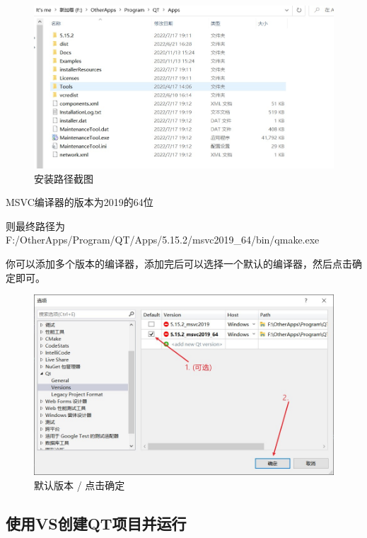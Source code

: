\documentclass[cs4size,a4paper]{ctexart}
\numberwithin{equation}{section}
\numberwithin{table}{section}
\numberwithin{figure}{section}
\begin{document}
\begin{figure}[H]
\small
\centering
\includegraphics[width=\textwidth]{安装路径截图.jpg}
\caption{安装路径截图} \label{fig:安装路径截图}
\end{figure}

MSVC编译器的版本为\colorbox{LetMeFlyGray}{2019}的\colorbox{LetMeFlyGray}{64位}

则最终路径为\colorbox{LetMeFlyGray}{F:/OtherApps/Program/QT/Apps/5.15.2/msvc2019\_64/bin/qmake.exe}

你可以添加多个版本的编译器，添加完后可以选择一个默认的编译器，然后点击确定即可。

\begin{figure}[H]
\small
\centering
\includegraphics[width=\textwidth]{默认版本+点击确定.jpg}
\caption{默认版本 / 点击确定} \label{fig:默认版本+点击确定}
\end{figure}

\subsection{使用VS创建QT项目并运行}
\end{document}
